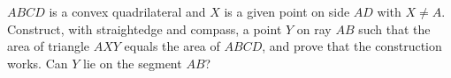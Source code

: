 $ABCD$ is a convex quadrilateral and $X$ is a given point on side $AD$ with $X\ne A$. Construct, with straightedge and compass, a point $Y$ on ray $AB$ such that the area of triangle $AXY$ equals the area of $ABCD$, and prove that the construction works. Can $Y$ lie on the segment $AB$?
